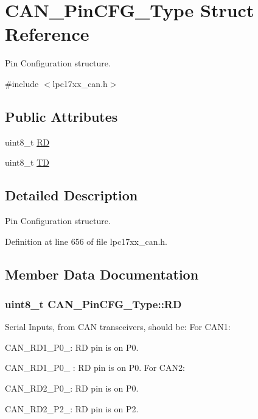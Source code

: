 \hypertarget{struct_c_a_n___pin_c_f_g___type}{\section{\-C\-A\-N\-\_\-\-Pin\-C\-F\-G\-\_\-\-Type \-Struct \-Reference}
\label{struct_c_a_n___pin_c_f_g___type}
}


\-Pin \-Configuration structure.  




{\ttfamily \#include $<$lpc17xx\-\_\-can.\-h$>$}

\subsection*{\-Public \-Attributes}
\begin{DoxyCompactItemize}
\item 
uint8\-\_\-t \hyperlink{struct_c_a_n___pin_c_f_g___type_a2656eda5e5d239401e23d9dcd1c1fa5c}{\-R\-D}
\item 
uint8\-\_\-t \hyperlink{struct_c_a_n___pin_c_f_g___type_a4ecc42cecab7fc4af5b841614ac57ab4}{\-T\-D}
\end{DoxyCompactItemize}


\subsection{\-Detailed \-Description}
\-Pin \-Configuration structure. 

\-Definition at line 656 of file lpc17xx\-\_\-can.\-h.



\subsection{\-Member \-Data \-Documentation}
\hypertarget{struct_c_a_n___pin_c_f_g___type_a2656eda5e5d239401e23d9dcd1c1fa5c}{
\subsubsection[{\-R\-D}]{\setlength{\rightskip}{0pt plus 5cm}uint8\-\_\-t {\bf \-C\-A\-N\-\_\-\-Pin\-C\-F\-G\-\_\-\-Type\-::\-R\-D}}}\label{struct_c_a_n___pin_c_f_g___type_a2656eda5e5d239401e23d9dcd1c1fa5c}
\-Serial \-Inputs, from \-C\-A\-N transceivers, should be\-: \-For \-C\-A\-N1\-:
\begin{DoxyItemize}
\item \-C\-A\-N\-\_\-\-R\-D1\-\_\-\-P0\-\_\-: \-R\-D pin is on \-P0.
\item \-C\-A\-N\-\_\-\-R\-D1\-\_\-\-P0\-\_ \-: \-R\-D pin is on \-P0. \-For \-C\-A\-N2\-:
\item \-C\-A\-N\-\_\-\-R\-D2\-\_\-\-P0\-\_\-: \-R\-D pin is on \-P0.
\item \-C\-A\-N\-\_\-\-R\-D2\-\_\-\-P2\-\_\-: \-R\-D pin is on \-P2. 
\end{DoxyItemize}

